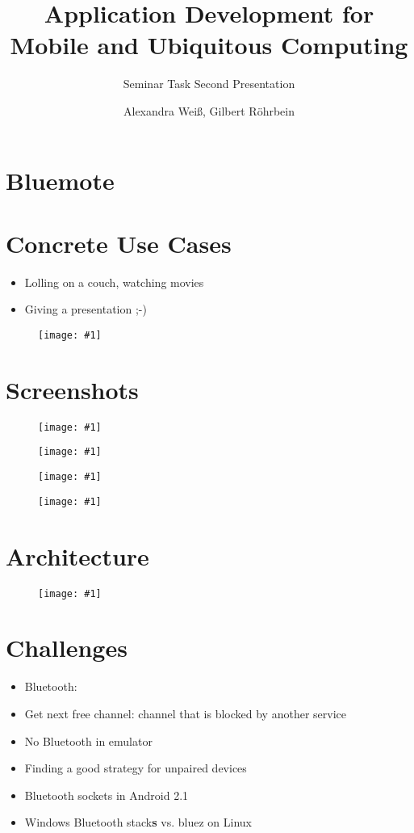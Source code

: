 \documentclass[ddc nogerman]{tudbeamer}
\newcommand{\imageframe}[1]{
    \begin{frame}
        \begin{figure}
            \centering
            \texttt{[image: \#1]}
        \end{figure}
    \end{frame}
}
\begin{document}

\title{Application Development for Mobile and Ubiquitous Computing}
\subtitle{Seminar Task Second Presentation}
\author{Alexandra Weiß, Gilbert Röhrbein}

\maketitle

\section{Bluemote}
\begin{frame}
\end{frame}

\section{Concrete Use Cases}
\begin{frame}
    \begin{itemize}
        \item Lolling on a couch, watching movies
        \item Giving a presentation ;-)
    \end{itemize}
\end{frame}

\imageframe{img/use-case-vlc.jpg}

\section{Screenshots}
\imageframe{img/choosedevice.png}
\imageframe{img/choosefunction.png}
\imageframe{img/presentation.png}
\imageframe{img/vlc.png}

\section{Architecture}
\imageframe{img/components.pdf}

\section{Challenges}
\begin{frame}
    \begin{itemize}
    	\item Bluetooth:
    	\item Get next free channel: channel that is blocked by another service
        \item No Bluetooth in emulator
        \item Finding a good strategy for unpaired devices
        \item Bluetooth sockets in Android 2.1
        \item Windows Bluetooth stack\textbf{s} vs. bluez on Linux
    \end{itemize}
\end{frame}
\end{document}
